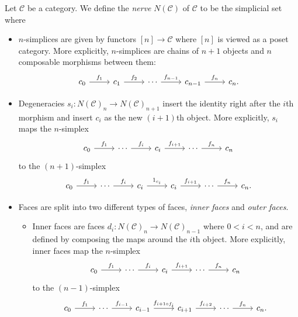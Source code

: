 \begin{definition}\label{3.13}
	Let $\mathcal{C} $ be a category. We define the \emph{nerve} $N(\mathcal{C} )$ of $\mathcal{C} $ to be the simplicial set where
	\begin{itemize}
		\item $n$-simplices are given by functors $[n]\to \mathcal{C} $ where $[n]$ is viewed as a poset category. More explicitly, $n$-simplices are chains of $n+1$ objects and $n$ composable morphisms between them:
			\[\begin{tikzcd}[row sep = 2.5em, column sep = 2.5em]
			c_0 \ar[" f_1 ", r]  & c_1 \ar[" f_2 ", r]  & \cdots \ar[" f_{n-1}  ", r] & c_{n-1} \ar[" f_n ", r]  & c_n.
			\end{tikzcd}\]
		\item Degeneracies $s_i : N(\mathcal{C} )_n \to N(\mathcal{C} )_{n+1} $ insert the identity right after the $i$th morphism and insert $c_i$ as the new $(i+1)$th object. More explicitly, $s_i$ maps the $n$-simplex
			\[\begin{tikzcd}[row sep = 2.5em, column sep = 2.5em]
				c_0 \ar[" f_1 ", r]   & \cdots \ar[" f_{i}  ", r] & c_{i} \ar[" f_{i+1}  ", r]  & \cdots \ar[" f_n ", r] & c_n
			\end{tikzcd}\]
			to the $(n+1)$-simplex
			\[\begin{tikzcd}[row sep = 2.5em, column sep = 2.5em]
				c_0 \ar[" f_1 ", r]   & \cdots \ar[" f_{i}  ", r] & c_{i} \ar[" 1_{c_i}  ", r] & c_i \ar[" f_{i+1}  ", r]  & \cdots \ar[" f_n ", r] & c_n.
			\end{tikzcd}\]
		\item Faces are split into two different types of faces, \emph{inner faces} and \emph{outer faces}.
			\begin{itemize}
				\item Inner faces are faces $d_i : N(\mathcal{C} )_n \to N(\mathcal{C} )_{n-1} $ where $0<i<n$, and are defined by composing the maps around the $i$th object. More explicitly, inner faces map the $n$-simplex
			\[\begin{tikzcd}[row sep = 2.5em, column sep = 2.5em]
				c_0 \ar[" f_1 ", r]   & \cdots \ar[" f_{i}  ", r] & c_{i} \ar[" f_{i+1}  ", r]  & \cdots \ar[" f_n ", r] & c_n
			\end{tikzcd}\]
			to the $(n-1)$-simplex
			\[\begin{tikzcd}[row sep = 2.5em, column sep = 2.5em]
				c_0 \ar[" f_1 ", r]   & \cdots \ar[" f_{i-1}", r] & c_{i-1} \ar[" f_{i+1\circ f_i}  ", r]  & c_{i+1} \ar[" f_{i+2} ", r]  &\cdots \ar[" f_n ", r] & c_n.

\end{tikzcd}\]
\end{itemize}
\end{itemize}
\end{definition}
